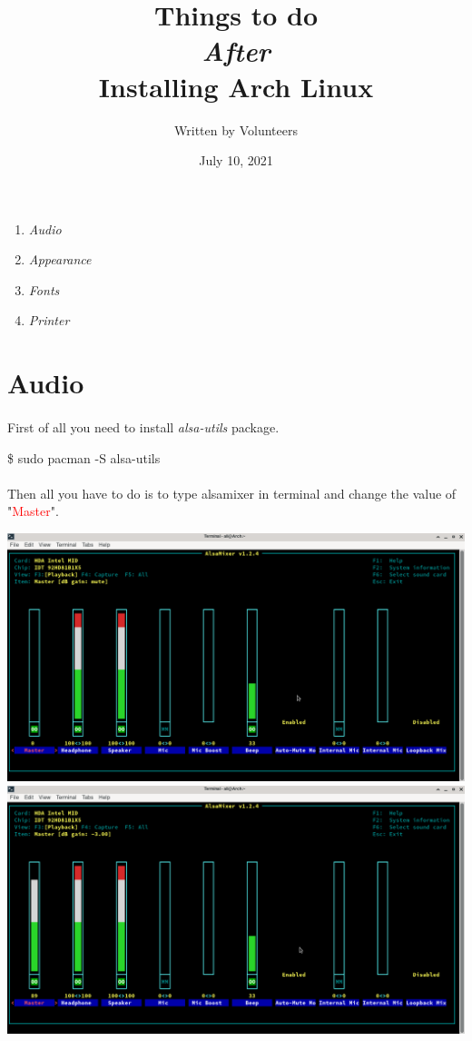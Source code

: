\documentclass[12pt, a4paper]{article}
\title{Things to do \\\emph{After}\\Installing Arch Linux}
\author{Written by Volunteers}
\date{July 10, 2021}
\begin{document}
\maketitle

\begin{huge}
\begin{enumerate}
	\item \emph{Audio}
	\item \emph{Appearance}
	\item \emph{Fonts}
	\item \emph{Printer}
\end{enumerate}
\end{huge}

\newpage
\section{Audio}
\paragraph{}
First of all you need to install \emph{alsa-utils} package.
\begin{flushleft}
	\$ sudo pacman -S alsa-utils
\end{flushleft}
\paragraph{}
Then all you have to do is to type alsamixer in terminal and change the value of "\textcolor{red}{Master}".\\
\begin{center}
	\includegraphics[scale=0.3]{mute.png}
	\includegraphics[scale=0.3]{audio.png}
\end{center}
\end{document}
